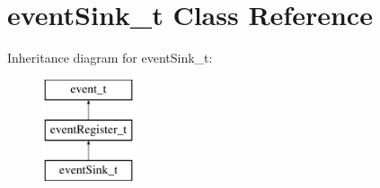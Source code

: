 \hypertarget{classeventSink__t}{\section{event\-Sink\-\_\-t \-Class \-Reference}
\label{classeventSink__t}
}
\-Inheritance diagram for event\-Sink\-\_\-t\-:\begin{figure}[H]
\begin{center}
\leavevmode
\includegraphics[height=3.000000cm]{classeventSink__t}
\end{center}
\end{figure}
